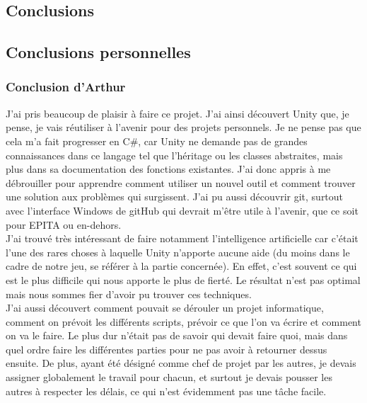 \documentclass[12pt, titlepage]{article}
\begin{document}
\begin{spacing}{1.5}
\newpage
\section*{Conclusions}

\subsection{Conclusions personnelles}

\subsubsection{Conclusion d'Arthur}

J'ai pris beaucoup de plaisir à faire ce projet. J'ai ainsi découvert Unity que, je pense, je vais réutiliser à l'avenir pour des projets personnels. Je ne pense pas que cela m'a fait progresser en C\#, car Unity ne demande pas de grandes connaissances dans ce langage tel que l'héritage ou les classes abstraites, mais plus dans sa documentation des fonctions existantes. J'ai donc appris à me débrouiller pour apprendre comment utiliser un nouvel outil et comment trouver une solution aux problèmes qui surgissent. J'ai pu aussi découvrir git, surtout avec l'interface Windows de gitHub qui devrait m'être utile à l'avenir, que ce soit pour EPITA ou en-dehors.\\

J'ai trouvé très intéressant de faire notamment l'intelligence artificielle car c'était l'une des rares choses à laquelle Unity n'apporte aucune aide (du moins dans le cadre de notre jeu, se référer à la partie concernée). En effet, c'est souvent ce qui est le plus difficile qui nous apporte le plus de fierté. Le résultat n'est pas optimal mais nous sommes fier d'avoir pu trouver ces techniques.\\

J'ai aussi découvert comment pouvait se dérouler un projet informatique, comment on prévoit les différents scripts, prévoir ce que l'on va écrire et comment on va le faire. Le plus dur n'était pas de savoir qui devait faire quoi, mais dans quel ordre faire les différentes parties pour ne pas avoir à retourner dessus ensuite. De plus, ayant été désigné comme chef de projet par les autres, je devais assigner globalement le travail pour chacun, et surtout je devais pousser les autres à respecter les délais, ce qui n'est évidemment pas une tâche facile.\\


\end{spacing}
\end{document}
